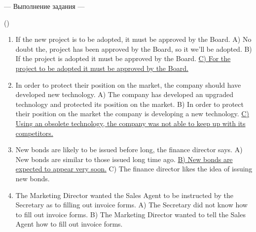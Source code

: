 \documentclass[main.tex]{subfiles}
\begin{document}


\newpage
{}

\hypertarget{ltask:2024-04-03-1}{--- Выполнение задания ---} (\hyperref[task:2024-04-03-1]{\color{blue}{перейти к тексту задания}})
\\

\vspace{5pt}
\begin{enumerate}[nosep, leftmargin=*]
	\itemsep15pt
	\item If the new project is to be adopted, it must be approved by the Board.\newline
		A) No doubt the, project has been approved by the Board, so it we'll be adopted.\newline
		B) If the project is adopted it must be approved by the Board.\newline
		\uline{C) For the project to be adopted it must be approved by the Board.}
	\item In order to protect their position on the market, the company should have developed new technology.\newline
		A) The company has developed an upgraded technology and protected its position on the market.\newline
		B) In order to protect their position on the market the company is developing a new technology.\newline
		\uline{C) Using an obsolete technology, the company was not able to keep up with its competitors.}
	\item New bonds are likely to be issued before long, the finance director says.\newline
		A) New bonds are similar to those issued long time ago.\newline
		\uline{B) New bonds are expected to appear very soon.}\newline
		C) The finance director likes the idea of issuing new bonds.
	\item The Marketing Director wanted the Sales Agent to be instructed by the Secretary as to filling out invoice forms.\newline
		A) The Secretary did not know how to fill out invoice forms.\newline
		B) The Marketing Director wanted to tell the Sales Agent how to fill out invoice forms.\newline

\end{enumerate}
\end{document}
